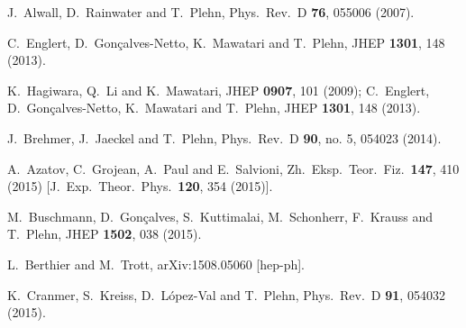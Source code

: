   J.~Alwall, D.~Rainwater and T.~Plehn,
  Phys.\ Rev.\ D {\bf 76}, 055006 (2007).

  C.~Englert, D.~Gon\c{c}alves-Netto, K.~Mawatari and T.~Plehn,
  JHEP {\bf 1301}, 148 (2013).

  K.~Hagiwara, Q.~Li and K.~Mawatari,
  JHEP {\bf 0907}, 101 (2009);
  C.~Englert, D.~Gon\c{c}alves-Netto, K.~Mawatari and T.~Plehn,
  JHEP {\bf 1301}, 148 (2013).
  
  J.~Brehmer, J.~Jaeckel and T.~Plehn,
  Phys.\ Rev.\ D {\bf 90}, no. 5, 054023 (2014).
  
  A.~Azatov, C.~Grojean, A.~Paul and E.~Salvioni,
  Zh.\ Eksp.\ Teor.\ Fiz.\  {\bf 147}, 410 (2015)
  [J.\ Exp.\ Theor.\ Phys.\  {\bf 120}, 354 (2015)].
  
  M.~Buschmann, D.~Gon\c{c}alves, S.~Kuttimalai, M.~Schonherr, F.~Krauss and T.~Plehn,
  JHEP {\bf 1502}, 038 (2015).
  
  L.~Berthier and M.~Trott,
  arXiv:1508.05060 [hep-ph].

  K.~Cranmer, S.~Kreiss, D.~L\'opez-Val and T.~Plehn,
  Phys.\ Rev.\ D {\bf 91}, 054032 (2015).

